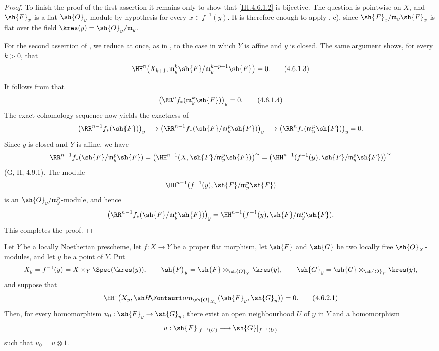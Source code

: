 \begin{proof}
To finish the proof of the first assertion it remains only to show
that \eqref{III.4.6.1.2} is bijective.  The question is pointwise on
$X$, and $\sh{F}_x$ is a flat $\sh{O}_y$-module by hypothesis for
every $x\in f^{-1}(y)$.  It is therefore enough to apply
, c), since
$\sh{F}_x/\mathfrak m_y\sh{F}_x$ is flat over the field
$\kres(y)=\sh{O}_y/\mathfrak m_y$.

For the second assertion of , we reduce at once, as
in , to the case in which $Y$ is affine and $y$ is
closed.  The same argument shows, for every $k>0$, that
\[
\label{III.4.6.1.3}
  \HH^n\bigl(X_{k+1},
    \mathfrak m_y^k\sh{F}/
      \mathfrak m_y^{k+p+1}\sh{F}\bigr)=0.
  \tag{4.6.1.3}
\]


It follows from  that
\[
\label{III.4.6.1.4}
  \bigl(\RR^n f_*(\mathfrak m_y^k\sh{F})\bigr)_y=0.
  \tag{4.6.1.4}
\]
The exact cohomology sequence now yields the exactness of
\[
  \bigl(\RR^{n-1}f_*(\sh{F})\bigr)_y
  \longrightarrow
  \bigl(\RR^{n-1}f_*
    (\sh{F}/\mathfrak m_y^p\sh{F})\bigr)_y
  \longrightarrow
  \bigl(\RR^n f_*(\mathfrak m_y^p\sh{F})\bigr)_y=0.
\]
Since $y$ is closed and $Y$ is affine, we have
\[
  \RR^{n-1}f_*(\sh{F}/\mathfrak m_y^p\sh{F})
  =
  \bigl(\HH^{n-1}
    (X,\sh{F}/\mathfrak m_y^p\sh{F})\bigr)^{\sim}
  =
  \bigl(\HH^{n-1}
    (f^{-1}(y),\sh{F}/\mathfrak m_y^p\sh{F})\bigr)^{\sim}
\]
(G, II, 4.9.1).  The module
\[
  \HH^{n-1}
    (f^{-1}(y),\sh{F}/\mathfrak m_y^p\sh{F})
\]
is an $\sh{O}_y/\mathfrak m_y^p$-module, and hence
\[
  \bigl(\RR^{n-1}f_*
    (\sh{F}/\mathfrak m_y^p\sh{F})\bigr)_y
  =
  \HH^{n-1}
    (f^{-1}(y),\sh{F}/\mathfrak m_y^p\sh{F}).
\]
This completes the proof.
\end{proof}

\begin{corollary}[4.6.2]
\label{III.4.6.2}
Let $Y$ be a locally Noetherian prescheme, let $f:X\to Y$ be a
proper flat morphism, let $\sh{F}$ and $\sh{G}$ be two locally free
$\sh{O}_X$-modules, and let $y$ be a point of $Y$.  Put
\[
  X_y=f^{-1}(y)=X\times_Y\Spec(\kres(y)),\qquad
  \sh{F}_y=\sh{F}\otimes_{\sh{O}_Y}\kres(y),\qquad
  \sh{G}_y=\sh{G}\otimes_{\sh{O}_Y}\kres(y),
\]
and suppose that
\[
\label{III.4.6.2.1}
  \HH^1\bigl(
    X_y,\shHom_{\sh{O}_{X_y}}(\sh{F}_y,\sh{G}_y)
  \bigr)=0.
  \tag{4.6.2.1}
\]
Then, for every homomorphism $u_0:\sh{F}_y\to\sh{G}_y$, there exist
an open neighbourhood $U$ of $y$ in $Y$ and a homomorphism
\[
  u:\sh{F}|_{f^{-1}(U)}\longrightarrow
    \sh{G}|_{f^{-1}(U)}
\]
such that $u_0=u\otimes1$.
\end{corollary}

